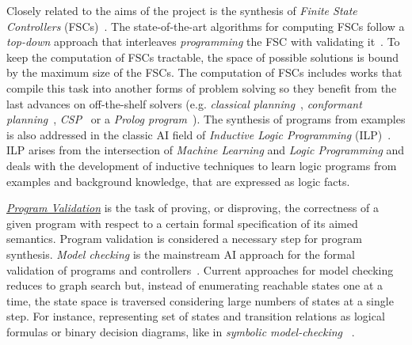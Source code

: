 \documentclass[10pt,a4paper]{paper}
\begin{document}
Closely related to the aims of the project is the synthesis of {\it Finite State Controllers} (FSCs)~\cite{geffner:policies:IJCAI15}. The state-of-the-art algorithms for computing FSCs follow a {\it top-down} approach that interleaves {\it programming} the FSC with validating it~\cite{sergio:aprograming:ijcai16,segovia:FSC:JAIR2018}. To keep the computation of FSCs tractable, the space of possible solutions is bound by the maximum size of the FSCs. The computation of FSCs includes works that compile this task into another forms of problem solving so they benefit from the last advances on off-the-shelf solvers (e.g. {\em classical planning}~\cite{sergio:aprograming:icaps16}, {\em conformant planning}~\cite{Geffner:FSM:AAAI10}, {\em CSP}~\cite{Infantes:FSC:ECAI2010} or a {\em Prolog program}~\cite{Giacomo:FSM:ICAPS13}). The synthesis of programs from examples is also addressed in the classic AI field of {\em Inductive Logic Programming} (ILP)~\cite{muggleton1991inductive,Raedt:relationalML:book2008}. ILP arises from the intersection of {\em Machine Learning} and {\em Logic Programming} and deals with the development of inductive techniques to learn logic programs from  examples and background knowledge, that are expressed as logic facts.

{\underline{\em Program Validation}} is the task of proving, or disproving, the correctness of a given program with respect to a certain formal specification of its aimed semantics. Program validation is considered a necessary step for program synthesis. {\em Model checking} is the mainstream AI approach for the formal validation of programs and controllers~\cite{clarke1999model}. Current approaches for model checking reduces to graph search but, instead of enumerating reachable states one at a time, the state space is traversed considering large numbers of states at a single step. For instance, representing set of states and transition relations as logical formulas or binary decision diagrams, like in {\em symbolic model-checking} ~\cite{mcmillan1993symbolic}.
\end{document}
